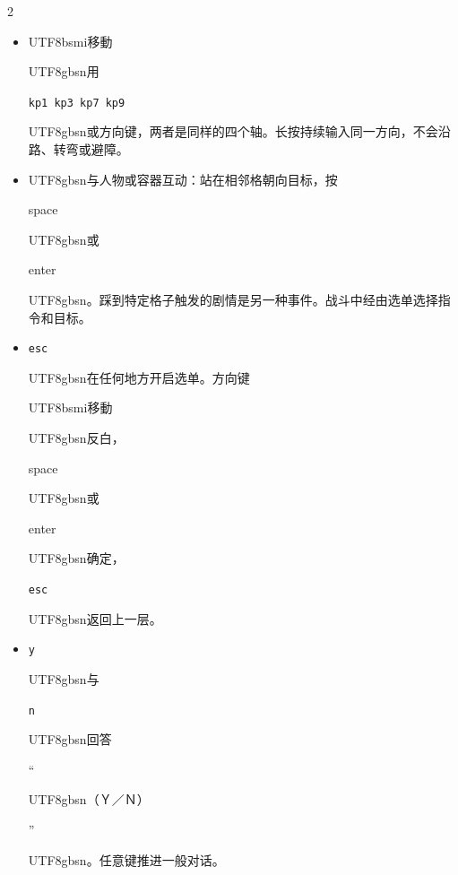 \begin{paracol}{2}
\begin{itemize}[leftmargin=*,topsep=1pt,itemsep=0pt,parsep=0pt]\item \begin{CJK}{UTF8}{bsmi}移動\end{CJK}\begin{CJK}{UTF8}{gbsn}用\end{CJK} \texttt{kp1 kp3 kp7 kp9} \begin{CJK}{UTF8}{gbsn}或方向键，两者是同样的四个轴。长按持续输入同一方向，不会沿路、转弯或避障。\end{CJK}\item \begin{CJK}{UTF8}{gbsn}与人物或容器互动：站在相邻格朝向目标，按\end{CJK} space \begin{CJK}{UTF8}{gbsn}或\end{CJK} enter\begin{CJK}{UTF8}{gbsn}。踩到特定格子触发的剧情是另一种事件。战斗中经由选单选择指令和目标。\end{CJK}\item \texttt{esc} \begin{CJK}{UTF8}{gbsn}在任何地方开启选单。方向键\end{CJK}\begin{CJK}{UTF8}{bsmi}移動\end{CJK}\begin{CJK}{UTF8}{gbsn}反白，\end{CJK}space \begin{CJK}{UTF8}{gbsn}或\end{CJK} enter \begin{CJK}{UTF8}{gbsn}确定，\end{CJK}\texttt{esc} \begin{CJK}{UTF8}{gbsn}返回上一层。\end{CJK}\item \texttt{y} \begin{CJK}{UTF8}{gbsn}与\end{CJK} \texttt{n} \begin{CJK}{UTF8}{gbsn}回答\end{CJK}“\begin{CJK}{UTF8}{gbsn}（Ｙ／Ｎ）\end{CJK}”\begin{CJK}{UTF8}{gbsn}。任意键推进一般对话。\end{CJK}\end{itemize}

\end{paracol}
